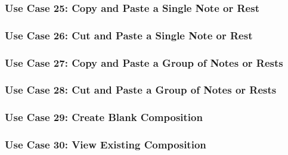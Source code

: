   \subsubsection{Use Case 25: Copy and Paste a Single Note or Rest}


  \subsubsection{Use Case 26: Cut and Paste a Single Note or Rest}


  \subsubsection{Use Case 27: Copy and Paste a Group of Notes or Rests}


  \subsubsection{Use Case 28: Cut and Paste a Group of Notes or Rests}


  \subsubsection{Use Case 29: Create Blank Composition}


  \subsubsection{Use Case 30: View Existing Composition}

